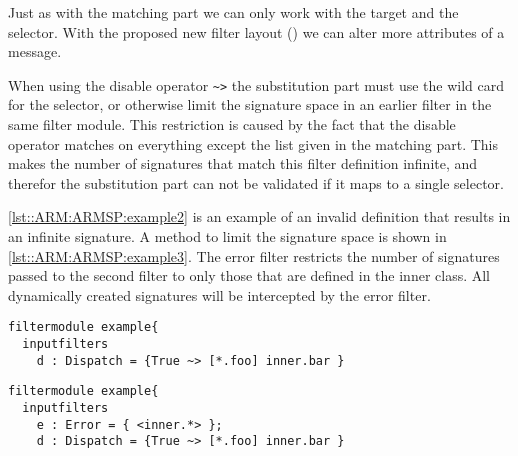 Just as with the matching part we can only work with the target and the selector. With the proposed
new filter layout (\cite{Doornenbal2006}) we can alter more attributes of a message.

When using the disable operator \lstinline[language=Composestar]|~>| the substitution part must use the wild card for the selector, or otherwise limit the signature space in an earlier filter in the same filter module. 
This restriction is caused by the fact that the disable operator matches on everything except the list given in the matching part. This makes the number of signatures that match this filter definition infinite, and therefor the substitution part can not be validated if it maps to a single selector. 

\autoref{lst::ARM:ARMSP:example2} is an example of an invalid definition that results in an infinite signature. A method to limit the signature space is shown in \autoref{lst::ARM:ARMSP:example3}. The error filter restricts the number of signatures passed to the second filter to only those that are defined in the inner class. All dynamically created signatures will be intercepted by the error filter.

\begin{lstlisting}[caption={Infinite signature definition},label=lst::ARM:ARMSP:example2,
style=listing,language =ComposeStar,float=tpb]
filtermodule example{
  inputfilters
    d : Dispatch = {True ~> [*.foo] inner.bar }
\end{lstlisting}

\begin{lstlisting}[caption={Limiting signature space},label=lst::ARM:ARMSP:example3,
style=listing,language =ComposeStar,float=tpb]
filtermodule example{
  inputfilters
    e : Error = { <inner.*> };
    d : Dispatch = {True ~> [*.foo] inner.bar }
\end{lstlisting}
